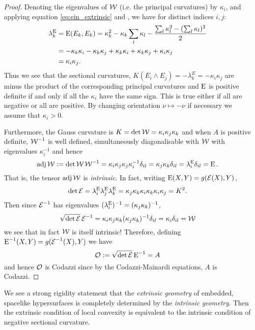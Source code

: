 \documentclass[a4paper, 12pt]{amsart}
\begin{document}
\begin{proof}
Denoting the eigenvalues of \(\operatorname{\mathcal{W}}\) (i.e. the principal curvatures) by \(\kappa_i\), and applying equation \eqref{eq:ein_extrinsic} and , we have for distinct indices \(i,j\):
\[
\begin{split}
\lambda^{\operatorname{E}}_k &= \operatorname{E}(E_k, E_k) = \kappa_k^2 - \kappa_k \sum_l \kappa_l - \frac{\sum_l \kappa_l^2 - (\sum_l \kappa_l)^2}{2} \\
&= - \kappa_k \kappa_i - \kappa_k \kappa_j + \kappa_k \kappa_i + \kappa_k \kappa_j + \kappa_i \kappa_j \\
&= \kappa_i \kappa_j.
\end{split}
\]
Thus we see that the sectional curvatures, \(K(E_i \wedge E_j) = - \lambda^E_k = -\kappa_i\kappa_j\) are minus the product of the corresponding principal curvatures and \(\operatorname{E}\) is positive definite if and only if all the \(\kappa_i\) have the same sign. This is true either if all are negative or all are positive. By changing orientation \(\nu \mapsto -\nu\) if necessary we assume that \(\kappa_i > 0\).

Furthermore, the Gauss curvature is \(K = \det \operatorname{\mathcal{W}} = \kappa_i \kappa_j \kappa_k\) and when \(A\) is positive definite, \(\operatorname{\mathcal{W}}^{-1}\) is well defined, simultaneously diagonalisable with \(\operatorname{\mathcal{W}}\) with eigenvalues \(\kappa_i^{-1}\) and hence
\[
\operatorname{adj} \operatorname{\mathcal{W}} := \det \operatorname{\mathcal{W}} \operatorname{\mathcal{W}}^{-1} = \kappa_i \kappa_j \kappa_j \kappa_i^{-1} \delta_{il} = \kappa_j \kappa_k \delta_{il} = \lambda^{\operatorname{E}}_i \delta_{il} = \operatorname{E}.
\]
That is, the tensor \(\operatorname{adj} \operatorname{\mathcal{W}}\) is \emph{intrinsic}. In fact, writing \(\operatorname{E}(X, Y) = g(\operatorname{\mathcal{E}} (X), Y)\),
\[
\det \operatorname{\mathcal{E}} = \lambda^{\operatorname{E}}_i \lambda^{\operatorname{E}}_j \lambda^{\operatorname{E}}_k = \kappa_j \kappa_k \kappa_i \kappa_k \kappa_i \kappa_j = K^2.
\]
Then since \(\operatorname{\mathcal{E}}^{-1}\) has eigenvalues \((\lambda_i^{\operatorname{E}})^{-1} = (\kappa_j \kappa_k)^{-1}\),
\[
\sqrt{\det \operatorname{\mathcal{E}}} \operatorname{\mathcal{E}}^{-1} = \kappa_i \kappa_j \kappa_k (\kappa_j \kappa_k)^{-1} \delta_{il} = \kappa_i \delta_{il} = \operatorname{\mathcal{W}}
\]
we see that in fact \(\operatorname{\mathcal{W}}\) is itself intrinsic! Therefore, defining \(\operatorname{E}^{-1}(X, Y) = g(\operatorname{\mathcal{E}}^{-1} (X), Y)\) we have
\[
\operatorname{\mathcal{O}} := \sqrt{\det \operatorname{\mathcal{E}}} \operatorname{E}^{-1} = A
\]
and hence \(\operatorname{\mathcal{O}}\) is Codazzi since by the Codazzi-Mainardi equations, \(A\) is Codazzi.
\end{proof}
\begin{rem}
We see a strong rigidity statement that the \emph{extrinsic geometry} of embedded, spacelike hypersurfaces is completely determined by the \emph{intrinsic geometry}. Then the extrinsic condition of local convexity is equivalent to the intrinsic condition of negative sectional curvature.
\end{rem}
\end{document}
